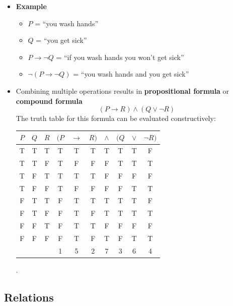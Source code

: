 \documentclass[11pt,twoside]{report}
\begin{document}
\begin{itemize}
  \item \textbf{Example} 
  \begin{itemize}
  \item $P$ = ``you wash hands''
  \item $Q$ = ``you get sick''
  \item $P \to \neg Q$  = ``if you wash hands you won't get sick''
  \item $\neg (P \to \neg Q)$  =    ``you wash hands and you get sick''
  \end{itemize}
  
\item Combining multiple operations results in \textbf{propositional formula} or \textbf{compound formula} 
\[
(P \rightarrow R) \wedge (Q \vee \neg R)
\]  
The truth table for this formula can be evaluated constructively:
\begin{center}
\begin{tabular}{|c|c|c|ccccccc|}
\hline
$P$ & $Q$ & $R$
& $(P$ & $\rightarrow$ & $R)$ & $\wedge$ & $(Q$ & $\vee$ & $\neg R)$ \\
\hline
T & T & T & T & T & T & T & T & T & F \\
T & T & F & T & F & F & F & T & T & T \\
T & F & T & T & T & T & F & F & F & F \\
T & F & F & T & F & F & F & F & T & T \\
F & T & T & F & T & T & T & T & T & F \\
F & T & F & F & T & F & T & T & T & T \\
F & F & T & F & T & T & F & F & F & F \\
F & F & F & F & T & F & T & F & T & T \\
& & & 1 & 5 & 2 & 7 & 3 & 6 & 4 \\
\hline
\end{tabular} .
\end{center}
  \end{itemize}
  
  
\subsection{Relations} 
 
\end{document}
